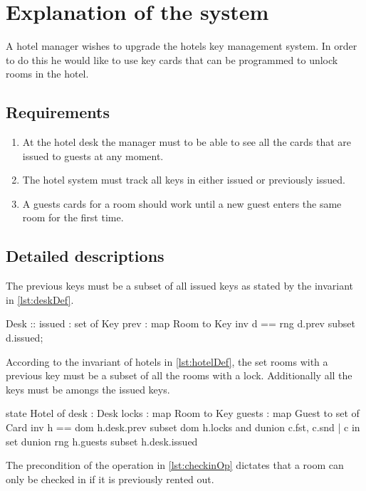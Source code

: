 \documentclass[Main]{subfiles}
\begin{document}
\section{Explanation of the system}

A hotel manager wishes to upgrade the hotels key management system.
In order to do this he would like to use key cards that can be programmed to unlock rooms in the hotel.

\subsection{Requirements}
\begin{enumerate}[R-1]
  \item At the hotel desk the manager must to be able to see all the cards that are issued to guests at any moment.
  \item The hotel system must track all keys in either issued or previously issued.
  \item A guests cards for a room should work until a new guest enters the same room for the first time.
\end{enumerate}

\subsection{Detailed descriptions}

The previous keys must be a subset of all issued keys as stated by the invariant in \codeTitle \ref{lst:deskDef}.

\begin{vdmsl}[label=lst:deskDef,caption=Desk definition]
Desk :: issued : set of Key
        prev   : map Room to Key
inv d == rng d.prev subset d.issued;
\end{vdmsl}
According to the invariant of hotels in \codeTitle \ref{lst:hotelDef}, the set rooms with a previous key must be a subset of all the rooms with a lock.
Additionally all the keys must be amongs the issued keys.
\newpage
\begin{vdmsl}[label=lst:hotelDef,caption=Hotel definition]
state Hotel of
  desk   : Desk
  locks  : map Room to Key
  guests : map Guest to set of Card
inv h == dom h.desk.prev subset dom h.locks and
  dunion {{c.fst, c.snd} | c in set dunion rng h.guests}
  subset h.desk.issued
\end{vdmsl}
The precondition of the  operation in \codeTitle\ref{lst:checkinOp} dictates that a room can only be checked in if it is previously rented out. 
\end{document}
